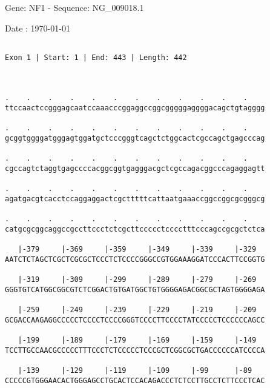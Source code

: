\documentclass{article}
\begin{document}
\begin{center}
\begin{large}
 Gene: NF1 - Sequence: NG\_009018.1
 
 Date : \today
\end{large}
\end{center}
 \begin{Verbatim}
 
Exon 1 | Start: 1 | End: 443 | Length: 442



.    .    .    .    .    .    .    .    .    .    .    .    
ttccaactccgggagcaatccaaacccggaggccggcgggggaggggacagctgtagggg
                                                            
.    .    .    .    .    .    .    .    .    .    .    .    
gcggtggggatgggagtggatgctcccgggtcagctctggcactcgccagctgagcccag
                                                            
.    .    .    .    .    .    .    .    .    .    .    .    
cgccagtctaggtgagccccacggcggtgagggacgctcgccagacggcccagaggagtt
                                                            
.    .    .    .    .    .    .    .    .    .    .    .    
agatgacgtcacctccaggaggactcgctttttcattaatgaaaccggccggcgcgggcg
                                                            
.    .    .    .    .    .    .    .    .    .    .    .    
catgcgcggcaggccgccttccctctcgcttccccctcccctttcccagccgcgctctca
                                                            
   |-379     |-369     |-359     |-349     |-339     |-329  
AATCTCTAGCTCGCTCGCGCTCCCTCTCCCCGGGCCGTGGAAAGGATCCCACTTCCGGTG
                                                            
   |-319     |-309     |-299     |-289     |-279     |-269  
GGGTGTCATGGCGGCGTCTCGGACTGTGATGGCTGTGGGGAGACGGCGCTAGTGGGGAGA
                                                            
   |-259     |-249     |-239     |-229     |-219     |-209  
GCGACCAAGAGGCCCCCTCCCCTCCCCGGGTCCCCTTCCCCTATCCCCCTCCCCCCAGCC
                                                            
   |-199     |-189     |-179     |-169     |-159     |-149  
TCCTTGCCAACGCCCCCTTTCCCTCTCCCCCTCCCGCTCGGCGCTGACCCCCCATCCCCA
                                                            
   |-139     |-129     |-119     |-109     |-99      |-89   
CCCCCGTGGGAACACTGGGAGCCTGCACTCCACAGACCCTCTCCTTGCCTCTTCCCTCAC
                                                            

\end{Verbatim}
\end{document}
